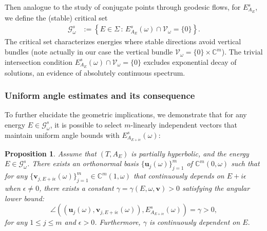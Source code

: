 \documentclass[11pt]{amsart}
\newtheorem{proposition}[theorem]{Proposition}
\theoremstyle{remark}
\theoremstyle{definition}
\begin{document}
Then analogue to the study of conjugate points through geodesic flows, for \( E^{s}_{A_E} \), we define the (stable) critical set
\begin{align*}
\mathcal{G}^s_\omega &:= \left\{ E \in \Sigma \,:\, E^s_{A_E}(\omega) \cap \mathcal{V}_\omega = \{0\} \right\}.
\end{align*}
The critical set characterizes energies where stable directions avoid vertical bundles (note actually in our case the vertical bundle $\mathcal{V}_{\omega} = \{0\} \times \mathbb{C}^m$). The trivial intersection condition \( E^s_{A_E}(\omega) \cap \mathcal{V}_\omega = \{0\} \) excludes exponential decay of solutions, an evidence of absolutely continuous spectrum.



\subsubsection{Uniform angle estimates and its consequence}\label{sec: ang est1}

To further elucidate the geometric implications, we demonstrate that for any energy $ E \in \mathcal{G}^s_\omega $, it is possible to select $ m $-linearly independent vectors that maintain uniform angle bounds with $ E^s_{A_{E+i\epsilon}}(\omega) $:

\begin{proposition}\label{lem: key ang est1}
Assume that \( (T,A_E) \) is partially hyperbolic, and the energy \( E \in \mathcal{G}^s_\omega \). There exists an orthonormal basis \( \{\mathbf{u}_j(\omega)\}_{j=1}^m \) of \( \mathbb{C}^m(0,\omega) \) such that for any \( \{\mathbf{v}_{j,E+i\epsilon}(\omega)\}_{j=1}^m \in \mathbb{C}^m(1,\omega) \) that continuously depends on \( E+i\epsilon \) when \( \epsilon \neq 0 \), there exists a constant \( \gamma = \gamma(E,\omega,\mathbf{v}) > 0 \) satisfying the angular lower bound:
\begin{equation}\label{angle1}
\angle\left((\mathbf{u}_j(\omega), \mathbf{v}_{j,E+i\epsilon}(\omega)), E^s_{A_{E+i\epsilon}}(\omega)\right) = \gamma>0,
\end{equation}
for any \( 1 \leq j \leq m \) and \( \epsilon > 0 \).
Furthermore, $\gamma$ is continuously dependent on $E.$
\end{proposition}
\end{document}
